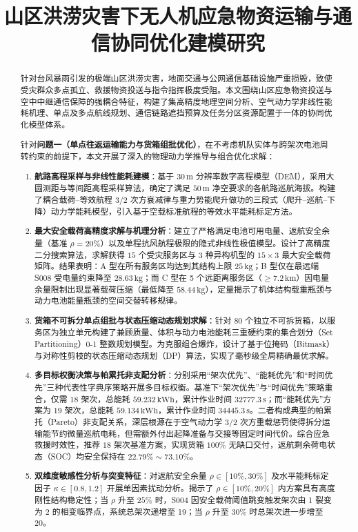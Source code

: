 \documentclass[12pt,a4paper,UTF8]{ctexart}
\title{\textbf{\Large 山区洪涝灾害下无人机应急物资运输与通信协同优化建模研究}}
\author{}
\date{}
\begin{document}
\maketitle

\begin{abstract}
针对台风暴雨引发的极端山区洪涝灾害，地面交通与公网通信基础设施严重损毁，致使受灾群众多点孤立、救援物资投送与指令指挥极度受阻。本文围绕山区应急物资投送与空中中继通信保障的强耦合特征，构建了集高精度地理空间分析、空气动力学非线性能耗机理、单点及多点航线规划、通信链路遮挡预算及任务分区资源配置于一体的协同优化模型体系。

针对\textbf{问题一（单点往返运输能力与货箱组批优化）}，在不考虑机队实体与跨架次电池周转约束的前提下，本文开展了深入的物理动力学推导与组合优化求解：
\begin{enumerate}[leftmargin=*]
    \item \textbf{航路高程采样与非线性能耗建模}：基于 $30\,\text{m}$ 分辨率数字高程模型（DEM），采用大圆测距与等间距高程采样算法，确定了满足 $50\,\text{m}$ 净空要求的各航路巡航海拔。构建了耦合载荷--等效航程 $3/2$ 次方衰减律与重力势能爬升做功的三段式（爬升--巡航--下降）动力学能耗模型，引入基于空载标准航程的等效水平能耗标定方法。
    \item \textbf{最大安全载荷高精度求解与机理分析}：建立了严格满足电池可用电量、返航安全余量（基准 $\rho=20\%$）以及单程抗风航程极限的隐式非线性极值模型。设计了高精度二分搜索算法，求解获得 $15$ 个受灾服务区与 $3$ 种异构机型的 $15 \times 3$ 最大安全载荷矩阵。结果表明：A 型在所有服务区均达到其结构上限 $25\,\text{kg}$；B 型仅在最远端 S008 受电量约束降至 $28.63\,\text{kg}$；而 C 型在 5 个远距离服务区（$\ge 7.2\,\text{km}$）因电量余量限制出现显著载荷压缩（最低降至 $58.44\,\text{kg}$），定量揭示了机体结构载重瓶颈与动力电池能量瓶颈的空间交替转移规律。
    \item \textbf{货箱不可拆分单点组批与状态压缩动态规划求解}：针对 $80$ 个独立不可拆货箱，以服务区为独立单元构建了兼顾质量、体积与动力电池能耗三重硬约束的集合划分（Set Partitioning）0-1 整数规划模型。为克服组合爆炸，设计了基于位掩码（Bitmask）与对称性剪枝的状态压缩动态规划（DP）算法，实现了毫秒级全局精确最优求解。
    \item \textbf{多目标权衡决策与帕累托非支配分析}：分别采用“架次优先”、“能耗优先”和“时间优先”三种代表性字典序策略开展多目标权衡。基准下“架次优先”与“时间优先”策略重合，仅需 $18$ 架次，总能耗 $59.232\,\text{kWh}$，累计作业时间 $32777.3\,\text{s}$；而“能耗优先”方案为 $19$ 架次，总能耗 $59.134\,\text{kWh}$，累计作业时间 $34445.3\,\text{s}$。二者构成典型的帕累托（Pareto）非支配关系，深层根源在于空气动力学 $3/2$ 次方重载惩罚使得拆分运输能节约微量巡航电耗，但需额外付出起降准备与交接等固定时间代价。综合应急救援时效性，推荐 $18$ 架次基准方案，实现货箱 $100\%$ 无缺口交付，返航剩余荷电状态（SOC）均安全保持在 $22.79\%\sim 73.10\%$。
    \item \textbf{双维度敏感性分析与突变特征}：对返航安全余量 $\rho \in [10\%, 30\%]$ 及水平能耗标定因子 $\kappa \in [0.8, 1.2]$ 开展单因素扰动分析。揭示了 $\rho \in [10\%, 20\%]$ 内方案具有高度刚性结构稳定性；当 $\rho$ 升至 $25\%$ 时，S004 因安全载荷阈值跳变触发架次由 1 裂变为 2 的相变临界点，系统总架次递增至 19；当 $\rho$ 升至 $30\%$ 时总架次进一步增至 20。
\end{enumerate}


\end{abstract}
\end{document}
